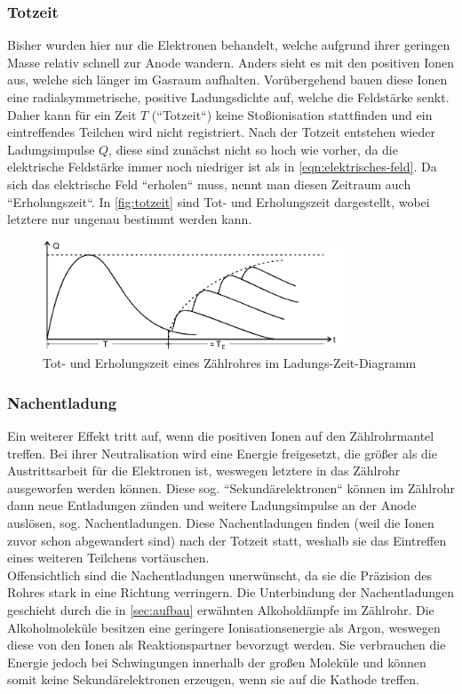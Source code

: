 \subsubsection{Totzeit}
\label{sec:totzeit}
Bisher wurden hier nur die Elektronen behandelt, welche aufgrund ihrer geringen Masse relativ schnell zur Anode 
wandern. Anders sieht es mit den positiven Ionen aus, welche sich länger im Gasraum aufhalten. Vorübergehend bauen
diese Ionen eine radialsymmetrische, positive Ladungsdichte auf, welche die Feldstärke senkt. Daher kann für ein Zeit
$T$ (``Totzeit``) keine Stoßionisation stattfinden und ein eintreffendes Teilchen wird nicht registriert. Nach der 
Totzeit
entstehen wieder Ladungsimpulse $Q$, diese sind zunächst nicht so hoch wie vorher, da die elektrische Feldstärke immer
noch niedriger ist als in \autoref{eqn:elektrisches-feld}. Da sich das elektrische Feld ``erholen`` muss, nennt man
diesen Zeitraum auch ``Erholungszeit``. 
In \autoref{fig:totzeit} sind Tot- und Erholungszeit dargestellt, wobei letztere nur ungenau bestimmt werden kann.
\begin{figure}[H]
	\centering
	\includegraphics[width=0.8\textwidth]{content/totzeit.png}
	\caption{Tot- und Erholungszeit eines Zählrohres im Ladungs-Zeit-Diagramm \cite{sample}}
	\label{fig:totzeit}
\end{figure}

\subsubsection{Nachentladung}
\label{sec:nachentladung}

Ein weiterer Effekt tritt auf, wenn die positiven Ionen auf den Zählrohrmantel treffen. Bei ihrer Neutralisation wird
eine Energie freigesetzt, die größer als die Austrittsarbeit für die Elektronen ist, weswegen letztere in das Zählrohr
ausgeworfen werden können. Diese sog. ``Sekundärelektronen`` können im Zählrohr dann neue Entladungen zünden und 
 weitere Ladungsimpulse an der Anode auslösen, sog. Nachentladungen. Diese Nachentladungen finden (weil die
Ionen zuvor schon abgewandert sind) nach der Totzeit statt, weshalb sie das Eintreffen eines weiteren Teilchens 
vortäuschen.
\\
Offensichtlich sind die Nachentladungen unerwünscht, da sie die Präzision des Rohres stark in eine Richtung verringern.
Die Unterbindung der Nachentladungen geschieht durch die in \autoref{sec:aufbau} erwähnten Alkoholdämpfe im 
Zählrohr. Die Alkoholmoleküle besitzen eine geringere Ionisationsenergie als Argon, weswegen diese von den Ionen als 
Reaktionspartner bevorzugt werden. Sie verbrauchen die Energie 
jedoch bei Schwingungen innerhalb der großen Moleküle und können somit keine Sekundärelektronen erzeugen, wenn sie 
auf die Kathode treffen.

